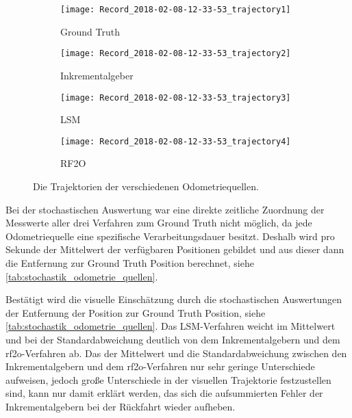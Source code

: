 \begin{figure}
	\centering
	\begin{subfigure}{0.49\linewidth}
		\centering
		\texttt{[image: Record\_2018-02-08-12-33-53\_trajectory1]}
		\caption{Ground Truth}
		\label{fig:Record_2018-02-08-12-33-53_trajectory1}
	\end{subfigure}
	\hfill
	\begin{subfigure}{0.49\linewidth}
		\centering
		\texttt{[image: Record\_2018-02-08-12-33-53\_trajectory2]}
		\caption{Inkrementalgeber}
		\label{fig:Record_2018-02-08-12-33-53_trajectory2}
	\end{subfigure}
	\par
	\bigskip
	\begin{subfigure}{0.49\linewidth}
		\centering
		\texttt{[image: Record\_2018-02-08-12-33-53\_trajectory3]}
		\caption{LSM}
		\label{fig:Record_2018-02-08-12-33-53_trajectory3}
	\end{subfigure}
	\hfill
	\begin{subfigure}{0.49\linewidth}
		\centering
		\texttt{[image: Record\_2018-02-08-12-33-53\_trajectory4]}
		\caption{RF2O}
		\label{fig:Record_2018-02-08-12-33-53_trajectory4}
	\end{subfigure}
	\caption{Die Trajektorien der verschiedenen Odometriequellen.}
	\label{fig:Record_2018-02-08-12-33-53_trajectory}
\end{figure}

Bei der stochastischen Auswertung war eine direkte zeitliche Zuordnung der Messwerte aller drei Verfahren zum Ground Truth nicht möglich, da jede Odometriequelle eine spezifische Verarbeitungsdauer besitzt. Deshalb wird pro Sekunde der Mittelwert der verfügbaren Positionen gebildet und aus dieser dann die Entfernung zur Ground Truth Position berechnet, siehe \autoref{tab:stochastik_odometrie_quellen}.

Bestätigt wird die visuelle Einschätzung durch die stochastischen Auswertungen der Entfernung der Position zur Ground Truth Position, siehe \autoref{tab:stochastik_odometrie_quellen}. Das LSM-Verfahren weicht im Mittelwert und bei der Standardabweichung deutlich von dem Inkrementalgebern und dem \gls{rf2o}-Verfahren ab. Das der Mittelwert und die Standardabweichung zwischen den Inkrementalgebern und dem \gls{rf2o}-Verfahren nur sehr geringe Unterschiede aufweisen, jedoch große Unterschiede in der visuellen Trajektorie festzustellen sind, kann nur damit erklärt werden, das sich die aufsummierten Fehler der Inkrementalgebern bei der Rückfahrt wieder aufheben.


